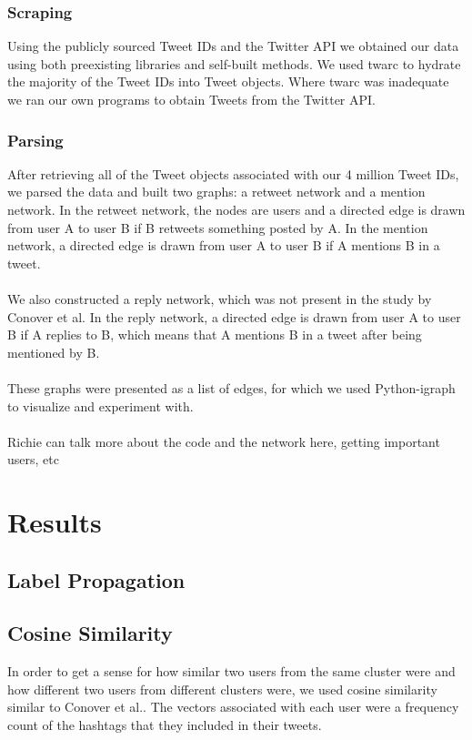 \documentclass{article}
\begin{document}
\subsubsection{Scraping}
Using the publicly sourced Tweet IDs and the Twitter API we obtained our data using both preexisting libraries and self-built methods. We used twarc\cite{twarc} to hydrate the majority of the Tweet IDs into Tweet objects. Where twarc was inadequate we ran our own programs to obtain Tweets from the Twitter API.
\subsubsection{Parsing}
After retrieving all of the Tweet objects associated with our 4 million Tweet IDs, we parsed the data and built two graphs: a retweet network and a mention network. In the retweet network, the nodes are users and a directed edge is drawn from user A to user B if B retweets something posted by A. In the mention network, a directed edge is drawn from user A to user B if A mentions B in a tweet.
\\\\
We also constructed a reply network, which was not present in the study by Conover et al. In the reply network, a directed edge is drawn from user A to user B if A replies to B, which means that A mentions B in a tweet after being mentioned by B. 
\\\\
These graphs were presented as a list of edges, for which we used Python-igraph to visualize and experiment with. 
\\\\
Richie can talk more about the code and the network here, getting important users, etc
\section{Results}
\subsection{Label Propagation}
\subsection{Cosine Similarity}
In order to get a sense for how similar two users from the same cluster were and how different two users from different clusters were, we used cosine similarity similar to Conover et al.\cite{conover}. The vectors associated with each user were a frequency count of the hashtags that they included in their tweets.
\end{document}
